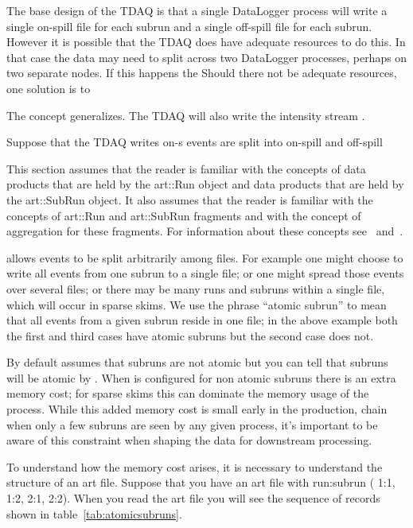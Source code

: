 The base design of the TDAQ is that
a single DataLogger process will write a single on-spill file for each subrun and a single off-spill file
for each subrun.  However it is possible that the TDAQ does have adequate resources to do this.
In that case the data may need to split across two DataLogger processes, perhaps on two separate nodes.
If this happens the
Should there not be adequate resources, one solution is to 

The concept generalizes.  The TDAQ will also write the intensity stream .


Suppose that the TDAQ writes on-s
events are split into
on-spill and off-spill







This section assumes that the reader is familiar with the \art concepts
of data products that are held by the {\code art::Run} object
and data products that are held by the {\code art::SubRun} object.
It also assumes that the reader is familiar with the \art concepts
of {\code art::Run} and {\code art::SubRun} fragments
and with the concept of aggregation for these fragments.
For information about these concepts see~\cite{RunAndSubRunProducts}
and~\cite{ProductAggregation}.


\art allows events to be split arbitrarily among files.  For example
one might choose to write all events from one subrun to a single file;
or one might spread those events over several files; or there may be
many runs and subruns within a single file, which will occur in
sparse skims.  We use the phrase ``atomic subrun'' to mean that
all events from a given subrun reside in one file; in the above
example both the first and third cases have atomic subruns but
the second case does not.

By default \art assumes that subruns are not atomic but you
can tell \art that subruns will be atomic by .
When \art is configured for non atomic subruns there is an extra memory cost;
for sparse skims this can dominate the memory usage of the process.
While this added memory cost is small early in the production, chain when
only a few subruns are seen by any given process, it's important to be
aware of this constraint when shaping the data for downstream processing.

To understand how the memory cost arises,
it is necessary to understand the structure of an art file.
Suppose that you have an art file with run:subrun ( 1:1, 1:2, 2:1, 2:2).
When you read the art file you will see the sequence of records shown
in table~\ref{tab:atomicsubruns}.


